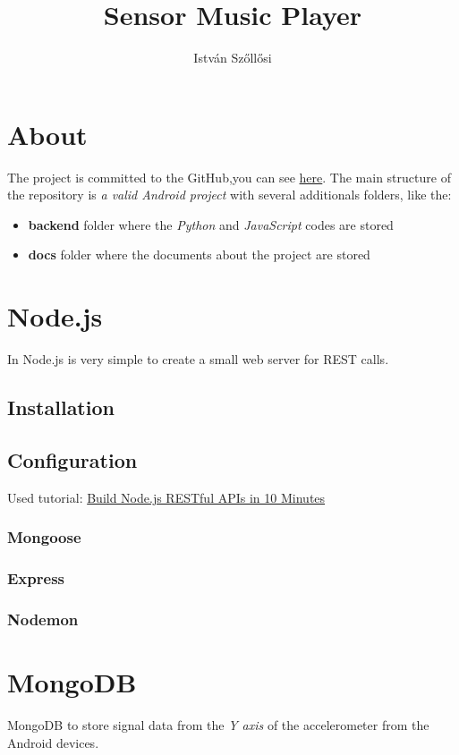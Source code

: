 \documentclass[12pt, a4paper, portrait]{article}
\title{\textbf{Sensor Music Player}}
\author{István Szőllősi}
\begin{document}
\maketitle
\newpage

\tableofcontents
\newpage

\section{About}
The project is committed to the GitHub,you can see \href{}{here}.
The main structure of the repository is
\textit{a valid Android project} with several additionals folders, like the:
\begin{itemize}
\item{\textbf{backend}} folder where the \textit{Python} and \textit{JavaScript} codes are stored
\item{\textbf{docs}} folder where the documents about the project are stored
\end{itemize}
\section{Node.js}
In Node.js is very simple to create a small web server for REST calls.
\subsection{Installation}
\subsection{Configuration}
Used tutorial: \href{https://www.codementor.io/olatundegaruba/nodejs-restful-apis-in-10-minutes-q0sgsfhbd}{Build Node.js RESTful APIs in 10 Minutes}
\subsubsection{Mongoose}
\subsubsection{Express}
\subsubsection{Nodemon}

\section{MongoDB}
MongoDB to store signal data from the \textit{Y axis} of the accelerometer from the Android devices.
\end{document}
